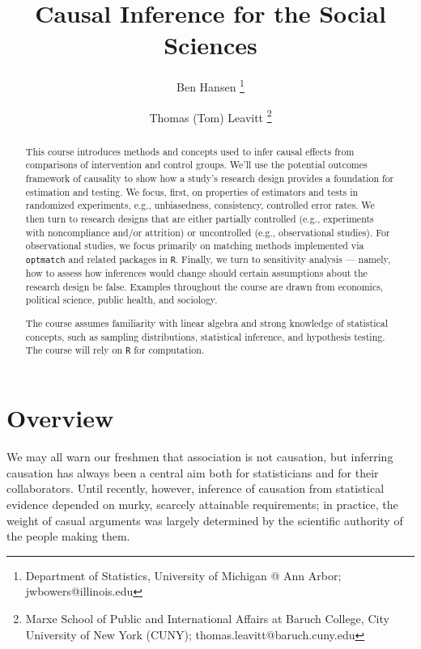 \documentclass[12pt]{article}
\title{Causal Inference for the Social Sciences}
\author{Ben Hansen \thanks{Department of Statistics, University of Michigan @ Ann Arbor; \mbox{jwbowers@illinois.edu}} \and
    Thomas (Tom) Leavitt \thanks{Marxe School of Public and International Affairs at Baruch College, City University of New York (CUNY); \mbox{thomas.leavitt@baruch.cuny.edu}} 
}
\begin{document}
\pagestyle{myfancy}

\maketitle
\begin{abstract}
\noindent This course introduces methods and concepts used to infer causal effects from comparisons of intervention and control groups. We'll use the potential outcomes framework of causality to show how a study's research design provides a foundation for estimation and testing. We focus, first, on properties of estimators and tests in randomized experiments, e.g., unbiasedness, consistency, controlled error rates. We then turn to research designs that are either partially controlled (e.g., experiments with noncompliance and/or attrition) or uncontrolled (e.g., observational studies). For observational studies, we focus primarily on matching methods implemented via \texttt{optmatch} and related packages in \texttt{R}. Finally, we turn to sensitivity analysis --- namely, how to assess how inferences would change should certain assumptions about the research design be false. Examples throughout the course are drawn from economics, political science, public health, and sociology.

The course assumes familiarity with linear algebra and strong knowledge of statistical concepts, such as sampling distributions, statistical inference, and hypothesis testing. The course will rely on \texttt{R} for computation.

\end{abstract}




\clearpage



\section*{Overview}

We may all warn our freshmen that association is not causation, but inferring causation has always been a central aim both for statisticians and for their collaborators. Until recently, however, inference of causation from statistical evidence depended on murky, scarcely attainable requirements; in practice, the weight of casual arguments was largely determined by the scientific authority of the people making them.
\end{document}
